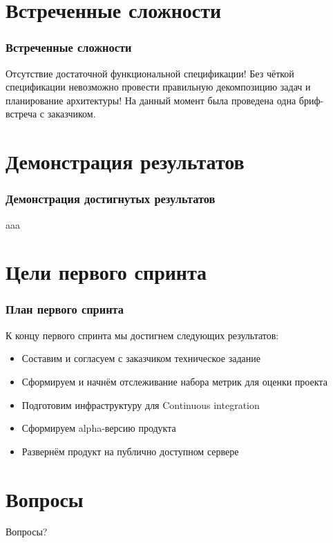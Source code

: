 \documentclass{beamer}
\begin{document}
\section{Встреченные сложности}

\begin{frame}
\frametitle{Встреченные сложности}

Отсутствие достаточной функциональной спецификации!
\bigskip
\bigskip
Без чёткой спецификации невозможно провести правильную декомпозицию задач и планирование архитектуры!
\bigskip
\bigskip
На данный момент была проведена одна бриф-встреча с заказчиком.
\end{frame}


\section{Демонстрация результатов}

\begin{frame}
\frametitle{Демонстрация достигнутых результатов}

aaa

\end{frame}

\section{Цели первого спринта}

\begin{frame}
\frametitle{План первого спринта}

К концу первого спринта мы достигнем следующих результатов:
\medskip
\begin{itemize}
\item Составим и согласуем с заказчиком техническое задание
\medskip
\item Сформируем и начнём отслеживание набора метрик для оценки проекта
\medskip
\item Подготовим инфраструктуру для Continuous integration
\medskip
\item Сформируем alpha-версию продукта
\medskip
\item Развернём продукт на публично доступном сервере
\end{itemize}

\end{frame}

\section{Вопросы}

\begin{frame}
\Huge{\centerline{Вопросы?}}
\end{frame}

\end{document}
